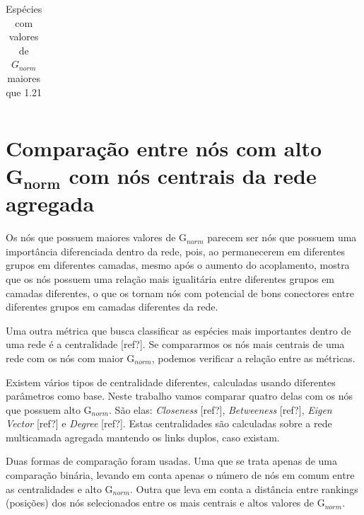 \documentclass[
  12pt,
]{article}
\begin{document}
\begin{table}[!h]

\caption{\label{tab:tabela_decimento_lento_b}\label{tab:3a}Espécies com valores de $G_{norm}$ maiores que 1.21}
\centering
\begin{tabular}[t]{ll}
\toprule
\cellcolor{gray!6}{Espécie} & \cellcolor{gray!6}{$G_{norm}$}\\


\bottomrule
\end{tabular}
\end{table}

\pagebreak

\hypertarget{comparauxe7uxe3o-entre-nuxf3s-com-alto-mathbfg_norm-com-nuxf3s-centrais-da-rede-agregada}{%
\section{\texorpdfstring{Comparação entre nós com alto
\(\mathbf{G_{norm}}\) com nós centrais da rede
agregada}{Comparação entre nós com alto \textbackslash mathbf\{G\_\{norm\}\} com nós centrais da rede agregada}}\label{comparauxe7uxe3o-entre-nuxf3s-com-alto-mathbfg_norm-com-nuxf3s-centrais-da-rede-agregada}}

Os nós que possuem maiores valores de G\(_{norm}\) parecem ser nós que
possuem uma importância diferenciada dentro da rede, pois, ao
permanecerem em diferentes grupos em diferentes camadas, mesmo após o
aumento do acoplamento, mostra que os nós possuem uma relação mais
igualitária entre diferentes grupos em camadas diferentes, o que os
tornam nós com potencial de bons conectores entre diferentes grupos em
camadas diferentes da rede.

Uma outra métrica que busca classificar as espécies mais importantes
dentro de uma rede é a centralidade {[}ref?{]}. Se compararmos os nós
mais centrais de uma rede com os nós com maior G\(_{norm}\), podemos
verificar a relação entre as métricas.

Existem vários tipos de centralidade diferentes, calculadas usando
diferentes parâmetros como base. Neste trabalho vamos comparar quatro
delas com os nós que possuem alto G\(_{norm}\). São elas:
\textit{Closeness} {[}ref?{]}, \textit{Betweeness} {[}ref?{]},
\textit{Eigen Vector} {[}ref?{]} e \textit{Degree} {[}ref?{]}. Estas
centralidades são calculadas sobre a rede multicamada agregada mantendo
os links duplos, caso existam.

Duas formas de comparação foram usadas. Uma que se trata apenas de uma
comparação binária, levando em conta apenas o número de nós em comum
entre as centralidades e alto G\(_{norm}\). Outra que leva em conta a
distância entre rankings (posições) dos nós selecionados entre os mais
centrais e altos valores de G\(_{norm}\).
\end{document}
